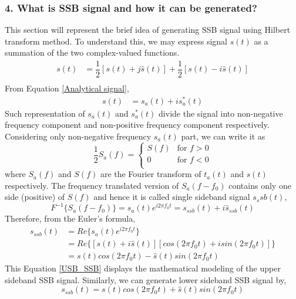 \subsubsection{4. What is SSB signal and how it can be generated?}
This section will represent the brief idea of generating SSB signal using Hilbert transform method. To understand this, we may express signal $s(t)$ as a summation of the two complex-valued functions.
\begin{equation}
\begin{split}
s(t)&=\dfrac{1}{2}[s(t)+j\hat{s}(t)]+\dfrac{1}{2}[s(t)-i\hat{s}(t)]\\
\end{split}
\label{}
\end{equation}
From Equation \ref{Analytical signal},
\begin{equation}
\begin{split}
	s(t)&=s_a(t)+i{s_a^*}(t)
\end{split}
\label{}
\end{equation}
Such representation of ${s_a}(t)$ and ${s_a^*}(t)$ divide the signal into non-negative frequency component and non-positive frequency component respectively. Considering only non-negative frequency ${s_a}(t)$ part, we can write it as
\begin{equation}
\dfrac{1}{2}{S_a}(f) = \begin{cases}
S(f) &\text{for $f>0$}\\
0    &\text{for $f<0$}\\
\end{cases}
\end{equation}
where ${S_a}(f)$ and ${S}(f)$ are the Fourier transform of ${t_a}(t)$ and ${s}(t)$ respectively. The frequency translated version of ${S_a}(f-f_0)$ contains only one side (positive) of ${S}(f)$ and hence it is called single sideband signal ${s_ssb}(t)$,
\begin{equation}
{F}^{-1}\{S_a(f-f_0)\}={s_a}(t) e^{i2\pi f_0 t}={s_{ssb}}(t)+i{\hat{s}_{ssb}(t)}
\end{equation}
Therefore, from the Euler's formula,
\begin{equation}
\begin{split}
{s}_{ssb}(t)&=Re\{s_a(t)  e^{i2\pi f_0 t}\}\\
&=Re\{[s(t)+i\hat{s}(t)] [cos(2\pi f_0t)+isin(2\pi f_0t)]\}\\
&=s(t)cos(2\pi f_0t)-\hat{s}(t)sin(2\pi f_0t)
\end{split}
\label{USB_SSB}
\end{equation}
This Equation \ref{USB_SSB} displays the mathematical modeling of the upper sideband SSB signal. Similarly, we can generate lower sideband SSB signal by,
\begin{equation}
{s}_{ssb}(t)=s(t)cos(2\pi f_0t)+\hat{s}(t)sin(2\pi f_0t)
\label{LSB_SSB}
\end{equation}


